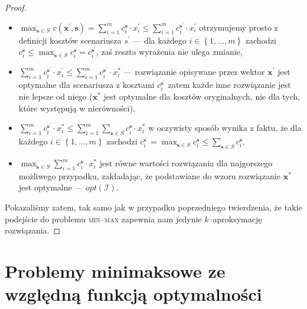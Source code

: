 \begin{proof}
	\begin{itemize}
		\item $\max_{\textbf{s} \in S} v \left( \textbf{x}^{\prime}, \textbf{s} \right) = \sum_{i = 1}^{m} c_{i}^{\textbf{s}} \cdot x_{i}^{\prime} \leqslant \sum_{i = 1}^{m} c_{i}^{\textbf{s}^{\prime}} \cdot x_{i}^{\prime}$ otrzymujemy prosto z definicji kosztów scenariusza $s^{\prime}$ --- dla każdego $i \in \left\{ 1, \dots, m \right\}$ zachodzi $c_{i}^{\textbf{s}} \leqslant \max_{\textbf{s} \in S} c^{\textbf{s}}_{i} = c_{i}^{\textbf{s}^{\prime}}$, zaś reszta wyrażenia nie ulega zmianie,
		\item $\sum_{i = 1}^{m} c_{i}^{\textbf{s}^{\prime}} \cdot x_{i}^{\prime} \leqslant \sum_{i = 1}^{m} c_{i}^{\textbf{s}^{\prime}} \cdot x_{i}^{\ast}$ --- rozwiązanie opisywane przez wektor $\textbf{x}^{\prime}$ jest optymalne dla scenariusza z kosztami $c_{i}^{\textbf{s}^{\prime}}$ zatem każde inne rozwiązanie jest nie lepsze od niego ($\textbf{x}^{\ast}$ jest optymalne dla kosztów oryginalnych, nie dla tych, które występują w nierówności),
		\item $\sum_{i = 1}^{m} c_{i}^{\textbf{s}^{\prime}} \cdot x_{i}^{\ast} \leqslant \sum_{i = 1}^{m} \sum_{\textbf{s} \in S} c_{i}^{\textbf{s}} \cdot x_{i}^{\ast}$ w oczywisty sposób wynika z faktu, że dla każdego $i \in \left\{ 1, \dots, m \right\}$ zachodzi $c_{i}^{\textbf{s}^{\prime}} = \max_{\textbf{s} \in S} c^{\textbf{s}}_{i} \leqslant \sum_{\textbf{s} \in S} c^{\textbf{s}}_{i}$,
		\item $\max_{\textbf{s} \in S} \sum_{i = 1}^{m} c_{i}^{\textbf{s}} \cdot x_{i}^{\ast}$ jest równe wartości rozwiązania dla najgorszego możliwego przypadku, zakładając, że podstawiane do wzoru rozwiązanie $\textbf{x}^{\ast}$ jest optymalne --- $ opt \left( \mathcal{I} \right)$.
	\end{itemize}
	
	Pokazaliśmy zatem, tak samo jak w przypadku poprzedniego twierdzenia, że takie podejście do problemu \textsc{min--max} zapewnia nam jedynie $k$--aproksymację rozwiązania.
\end{proof}

\section{Problemy minimaksowe ze względną funkcją optymalności}

